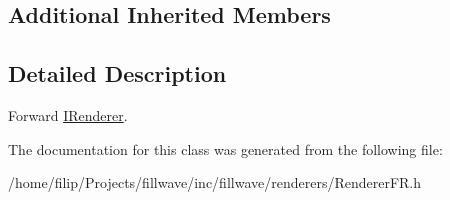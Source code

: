 \subsection*{Additional Inherited Members}


\subsection{Detailed Description}
Forward \hyperlink{classflw_1_1flf_1_1IRenderer}{I\+Renderer}. 

The documentation for this class was generated from the following file\+:\begin{DoxyCompactItemize}
\item 
/home/filip/\+Projects/fillwave/inc/fillwave/renderers/Renderer\+F\+R.\+h\end{DoxyCompactItemize}
